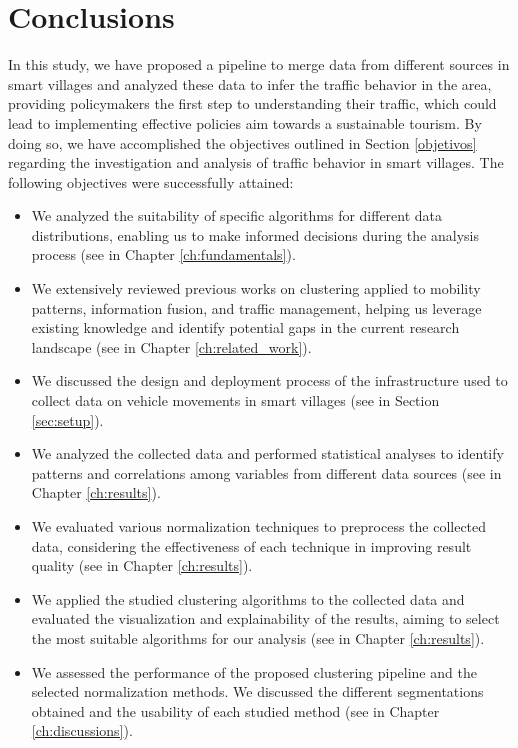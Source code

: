 \chapter{Conclusions} \label{ch:future}

In this study, we have proposed a pipeline to merge data from different sources in smart villages and analyzed these data to infer the traffic behavior in the area, providing policymakers the first step to understanding their traffic, which could lead to implementing effective policies aim towards a sustainable tourism. By doing so, we have accomplished the objectives outlined in Section \ref{objetivos} regarding the investigation and analysis of traffic behavior in smart villages. The following objectives were successfully attained:

\begin{itemize}
    \item We analyzed the suitability of specific algorithms for different data distributions, enabling us to make informed decisions during the analysis process (see in Chapter \ref{ch:fundamentals}).
    \item We extensively reviewed previous works on clustering applied to mobility patterns, information fusion, and traffic management, helping us leverage existing knowledge and identify potential gaps in the current research landscape (see in Chapter \ref{ch:related_work}).
    \item We discussed the design and deployment process of the infrastructure used to collect data on vehicle movements in smart villages (see in Section \ref{sec:setup}).
    \item We analyzed the collected data and performed statistical analyses to identify patterns and correlations among variables from different data sources (see in Chapter \ref{ch:results}).
    \item We evaluated various normalization techniques to preprocess the collected data, considering the effectiveness of each technique in improving result quality (see in Chapter \ref{ch:results}).
    \item We applied the studied clustering algorithms to the collected data and evaluated the visualization and explainability of the results, aiming to select the most suitable algorithms for our analysis (see in Chapter \ref{ch:results}).
    \item We assessed the performance of the proposed clustering pipeline and the selected normalization methods. We discussed the different segmentations obtained and the usability of each studied method (see in Chapter \ref{ch:discussions}).
\end{itemize}

